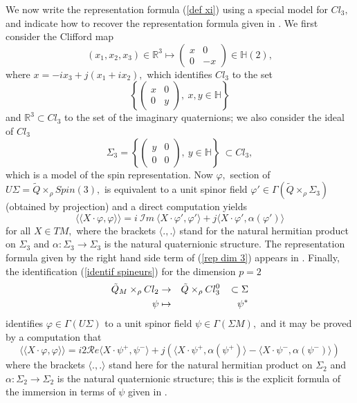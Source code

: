 \documentclass{amsart}
\begin{document}
We now write the representation formula (\ref{def xi}) using a special model for $Cl_3,$ and indicate how to recover the representation formula given in \cite{Fr}. We first consider the Clifford map
$$(x_1,x_2,x_3)\in{\mathbb{R}}^3\mapsto \left(\begin{array}{cc}x&0\\0&-x\end{array}\right)\in {\mathbb{H}}(2),$$
where $x=-ix_3+j(x_1+ix_2),$ which identifies $Cl_3$ to the set
$$\left\{\left(\begin{array}{cc}x&0\\0&y\end{array}\right),\ x,y\in{\mathbb{H}}\right\}$$
and ${\mathbb{R}}^3\subset Cl_3$ to the set of the imaginary quaternions; we also consider the ideal of $Cl_3$
\begin{equation}\label{def sigma3}
\Sigma_3=\left\{\left(\begin{array}{cc}y&0\\0&0\end{array}\right),\ y\in{\mathbb{H}}\right\}\ \subset Cl_3,
\end{equation}
which is a model of the spin representation. Now $\varphi,$ section of $U\Sigma=\tilde{Q}\times_{\rho} Spin(3),$ is equivalent to a unit spinor field $\varphi'\in\Gamma(\tilde{Q}\times_{\rho}\Sigma_3)$ (obtained by projection) and a direct computation yields
\begin{equation}\label{rep dim 3}
\langle\langle X\cdot\varphi,\varphi\rangle\rangle=i\ \mathcal{I}m\ \langle X\cdot\varphi',\varphi'\rangle+j\langle X\cdot\varphi',\alpha(\varphi')\rangle
\end{equation}
for all $X\in TM,$ where the brackets $\langle.,.\rangle$ stand for the natural hermitian product on $\Sigma_3$ and $\alpha:\Sigma_3\rightarrow\Sigma_3$ is the natural quaternionic structure. The representation formula given by the right hand side term of (\ref{rep dim 3}) appears in \cite{Fr}. Finally, the identification (\ref{identif spineurs}) for the dimension $p=2$
\begin{eqnarray*}
\tilde{Q}_M\times_{\rho} Cl_2&\rightarrow& \tilde{Q}\times_{\rho} Cl^0_{3}\hspace{.3cm} \subset\Sigma\\
\psi&\mapsto&\psi^*
\end{eqnarray*}
identifies $\varphi\in\Gamma(U\Sigma)$ to a unit spinor field $\psi\in\Gamma(\Sigma M),$ and it may be proved by a computation that
$$\langle\langle X\cdot\varphi,\varphi\rangle\rangle=i2\mathcal{R}e\langle X\cdot\psi^+,\psi^-\rangle+j\left(\langle X\cdot\psi^+,\alpha(\psi^+)\rangle-\langle X\cdot\psi^-,\alpha(\psi^-)\rangle\right)$$
where the brackets $\langle.,.\rangle$ stand here for the natural hermitian product on $\Sigma_2$ and $\alpha:\Sigma_2\rightarrow\Sigma_2$ is the natural quaternionic structure; this is the explicit formula of the immersion in terms of $\psi$ given in \cite{Fr}.
\end{document}
